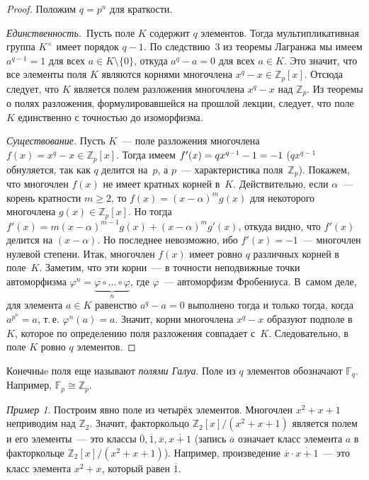 \documentclass[a4paper,10pt]{amsart}
\def\FF{{\mathbb F}}%
\def\ZZ{{\mathbb Z}}%
\theoremstyle{definition}
\theoremstyle{remark}
\newtheorem{example}{Пример}
\begin{document}
\begin{proof}
Положим $q = p^n$ для краткости.

{\it Единственность.}\ Пусть поле $K$ содержит $q$ элементов. Тогда
мультипликативная группа $K^{\times}$ имеет порядок $q-1$. По
следствию~3 из теоремы Лагранжа мы имеем $a^{q-1}=1$ для всех $a \in
K \setminus \{0\}$, откуда $a^q - a = 0$ для всех $a\in K$. Это
значит, что все элементы поля $K$ являются корнями многочлена $x^q -
x \in \ZZ_p[x]$. Отсюда следует, что $K$ является полем разложения
многочлена $x^q - x$ над $\ZZ_p$. Из теоремы о полях разложения,
формулировавшейся на прошлой лекции, следует, что поле $K$
единственно с точностью до изоморфизма.

\smallskip

{\it Существование.} Пусть $K$~--- поле разложения многочлена $f(x)
= x^q - x \in \ZZ_p[x]$. Тогда имеем $f'(x)= qx^{q-1} - 1 =\nobreak
-1$ ($qx^{q-1}$ обнуляется, так как $q$ делится на~$p$, а $p$~---
характеристика поля~$\ZZ_p$). Покажем, что многочлен $f(x)$ не имеет
кратных корней в~$K$. Действительно, если $\alpha$~--- корень
кратности $m \geqslant 2$, то $f(x) = (x - \alpha)^m g(x)$ для
некоторого многочлена $g(x) \in \ZZ_p[x]$. Но тогда $f'(x) =
m(x-\alpha)^{m-1} g(x) + (x - \alpha)^m g'(x)$, откуда видно, что
$f'(x)$ делится на $(x - \alpha)$. Но последнее невозможно, ибо
$f'(x) = -1$~--- многочлен нулевой степени. Итак, многочлен $f(x)$
имеет ровно $q$ различных корней в поле~$K$. Заметим, что эти
корни~--- в точности неподвижные точки автоморфизма $\varphi^n =
\underbrace{\varphi \circ \ldots \circ \varphi}_n$, где
$\varphi$~--- автоморфизм Фробениуса. В~самом деле, для элемента $a
\in K$ равенство $a^q - a = 0$ выполнено тогда и только тогда, когда
$a^{p^n} = a$, т.\,е. $\varphi^n(a) = a$. Значит, корни многочлена
$x^q-x$ образуют подполе в~$K$, которое по определению поля
разложения совпадает с~$K$. Следовательно, в поле $K$ ровно $q$
элементов.
\end{proof}

Конечныe поля еще называют {\it полями Галуа}. Поле из $q$ элементов
обозначают $\FF_q$. Например, $\FF_p \cong \ZZ_p$.

\begin{example}
Построим явно поле из четырёх элементов. Многочлен $x^2+x+1$
неприводим над $\ZZ_2$. Значит, факторкольцо $\ZZ_2[x]/(x^2+x+1)$
является полем и его элементы~--- это классы $\overline{0},
\overline{1}, \overline{x}, \overline{x+1}$ (запись $\overline a$
означает класс элемента $a$ в факторкольце $\ZZ_2[x]/(x^2+x+1)$).
Например, произведение $\overline{x} \cdot \overline{x+1}$~--- это
класс элемента $x^2+x$, который равен $\overline{1}$.
\end{example}
\end{document}

